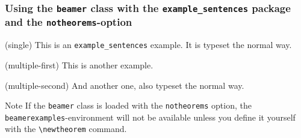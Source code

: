 \documentclass[notheorems]{beamer}
\begin{document}
	\begin{frame}
		\frametitle{Using the \texttt{beamer} class with the \texttt{example\_sentences} package and the \texttt{notheorems}-option}
		\begin{example}
			\item(single) This is an \texttt{example\_sentences} example. It is typeset the normal way.
		\end{example}
		\begin{examples}
		 	 \item(multiple-first) This is another example.
		 	 \item(multiple-second) And another one, also typeset the normal way.
		\end{examples}
		\begin{block}{Note}
			If the \texttt{beamer} class is loaded with the \texttt{notheorems} option, the \texttt{beamerexamples}-environment will not be available unless you define it yourself with the
    \texttt{\textbackslash{}newtheorem} command.
		\end{block} 
	\end{frame}
\end{document}
